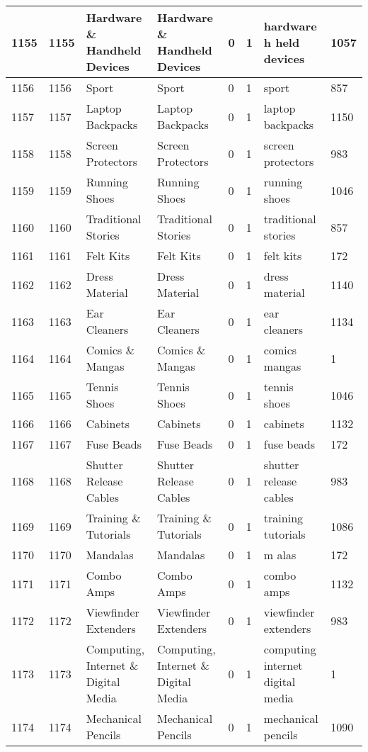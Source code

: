 \begin{longtable}{|l|l|l|l|l|l|l|l|}
1155 & 1155 & Hardware \& Handheld Devices & Hardware \& Handheld Devices & 0 & 1 & hardware h held devices & 1057 \\ \hline 
1156 & 1156 & Sport & Sport & 0 & 1 & sport & 857 \\ \hline 
1157 & 1157 & Laptop Backpacks & Laptop Backpacks & 0 & 1 & laptop backpacks & 1150 \\ \hline 
1158 & 1158 & Screen Protectors & Screen Protectors & 0 & 1 & screen protectors & 983 \\ \hline 
1159 & 1159 & Running Shoes & Running Shoes & 0 & 1 & running shoes & 1046 \\ \hline 
1160 & 1160 & Traditional Stories & Traditional Stories & 0 & 1 & traditional stories & 857 \\ \hline 
1161 & 1161 & Felt Kits & Felt Kits & 0 & 1 & felt kits & 172 \\ \hline 
1162 & 1162 & Dress Material & Dress Material & 0 & 1 & dress material & 1140 \\ \hline 
1163 & 1163 & Ear Cleaners & Ear Cleaners & 0 & 1 & ear cleaners & 1134 \\ \hline 
1164 & 1164 & Comics \& Mangas & Comics \& Mangas & 0 & 1 & comics mangas & 1 \\ \hline 
1165 & 1165 & Tennis Shoes & Tennis Shoes & 0 & 1 & tennis shoes & 1046 \\ \hline 
1166 & 1166 & Cabinets & Cabinets & 0 & 1 & cabinets & 1132 \\ \hline 
1167 & 1167 & Fuse Beads & Fuse Beads & 0 & 1 & fuse beads & 172 \\ \hline 
1168 & 1168 & Shutter Release Cables & Shutter Release Cables & 0 & 1 & shutter release cables & 983 \\ \hline 
1169 & 1169 & Training \& Tutorials & Training \& Tutorials & 0 & 1 & training tutorials & 1086 \\ \hline 
1170 & 1170 & Mandalas & Mandalas & 0 & 1 & m alas & 172 \\ \hline 
1171 & 1171 & Combo Amps & Combo Amps & 0 & 1 & combo amps & 1132 \\ \hline 
1172 & 1172 & Viewfinder Extenders & Viewfinder Extenders & 0 & 1 & viewfinder extenders & 983 \\ \hline 
1173 & 1173 & Computing, Internet \& Digital Media & Computing, Internet \& Digital Media & 0 & 1 & computing internet digital media & 1 \\ \hline 
1174 & 1174 & Mechanical Pencils & Mechanical Pencils & 0 & 1 & mechanical pencils & 1090 \\ \hline 

\end{longtable}
